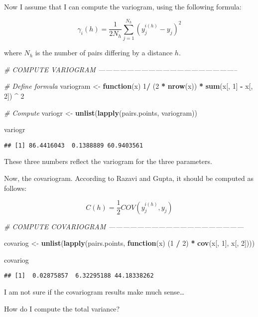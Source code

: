\documentclass[11pt,]{article}
\newenvironment{Shaded}{\begin{snugshade}}{\end{snugshade}}
\newcommand{\CommentTok}[1]{\textcolor[rgb]{0.56,0.35,0.01}{\textit{#1}}}
\newcommand{\ControlFlowTok}[1]{\textcolor[rgb]{0.13,0.29,0.53}{\textbf{#1}}}
\newcommand{\DecValTok}[1]{\textcolor[rgb]{0.00,0.00,0.81}{#1}}
\newcommand{\KeywordTok}[1]{\textcolor[rgb]{0.13,0.29,0.53}{\textbf{#1}}}
\newcommand{\NormalTok}[1]{#1}
\newcommand{\OperatorTok}[1]{\textcolor[rgb]{0.81,0.36,0.00}{\textbf{#1}}}
\newcommand{\StringTok}[1]{\textcolor[rgb]{0.31,0.60,0.02}{#1}}
\begin{document}
Now I assume that I can compute the variogram, using the following
formula:

\begin{equation}
\gamma_i(h) = \frac{1}{2N_h} \sum_{j=1}^{N_h}(y_j^{i(h)} - y_j)^2
\end{equation}

where \(N_h\) is the number of pairs differing by a distance \(h\).

\begin{Shaded}
\begin{Highlighting}[]
\CommentTok{# COMPUTE VARIOGRAM -----------------------------------------------------------}

\CommentTok{# Define formula}
\NormalTok{variogram <-}\StringTok{ }\ControlFlowTok{function}\NormalTok{(x) }\DecValTok{1}\OperatorTok{/}\StringTok{ }\NormalTok{(}\DecValTok{2} \OperatorTok{*}\StringTok{ }\KeywordTok{nrow}\NormalTok{(x)) }\OperatorTok{*}\StringTok{ }\KeywordTok{sum}\NormalTok{(x[, }\DecValTok{1}\NormalTok{] }\OperatorTok{-}\StringTok{ }\NormalTok{x[, }\DecValTok{2}\NormalTok{]) }\OperatorTok{^}\StringTok{ }\DecValTok{2}

\CommentTok{# Compute}
\NormalTok{variogr <-}\StringTok{ }\KeywordTok{unlist}\NormalTok{(}\KeywordTok{lapply}\NormalTok{(pairs.points, variogram))}

\NormalTok{variogr}
\end{Highlighting}
\end{Shaded}

\begin{verbatim}
## [1] 86.4416043  0.1388889 60.9403561
\end{verbatim}

These three numbers reflect the variogram for the three parameters.

Now, the covariogram. According to Razavi and Gupta, it should be
computed as follows:

\begin{equation}
C(h) = \frac{1}{2} COV(y_j^{i(h)}, y_j)
\end{equation}

\begin{Shaded}
\begin{Highlighting}[]
\CommentTok{# COMPUTE COVARIOGRAM ---------------------------------------------------------}

\NormalTok{covariog <-}\StringTok{ }\KeywordTok{unlist}\NormalTok{(}\KeywordTok{lapply}\NormalTok{(pairs.points, }\ControlFlowTok{function}\NormalTok{(x) (}\DecValTok{1} \OperatorTok{/}\StringTok{ }\DecValTok{2}\NormalTok{) }\OperatorTok{*}\StringTok{ }\KeywordTok{cov}\NormalTok{(x[, }\DecValTok{1}\NormalTok{], x[, }\DecValTok{2}\NormalTok{])))}

\NormalTok{covariog}
\end{Highlighting}
\end{Shaded}

\begin{verbatim}
## [1]  0.02875857  6.32295188 44.18338262
\end{verbatim}

I am not sure if the covariogram results make much sense\ldots{}

How do I compute the total variance?
\end{document}
